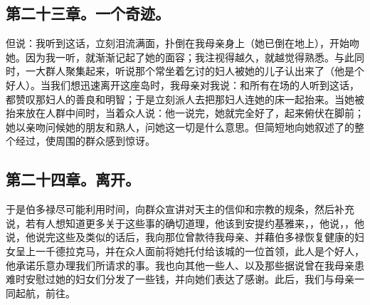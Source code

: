 
\subsection{第二十三章。一个奇迹。}

但说：我听到这话，立刻泪流满面，扑倒在我母亲身上（她已倒在地上），开始吻她。因为我一听，就渐渐记起了她的面容；我注视得越久，就越觉得熟悉。与此同时，一大群人聚集起来，听说那个常坐着乞讨的妇人被她的儿子认出来了（他是个好人）。当我们想迅速离开这座岛时，我母亲对我说：和所有在场的人听到这话，都赞叹那妇人的善良和明智；于是立刻派人去把那妇人连她的床一起抬来。当她被抬来放在人群中间时，当着众人说：他一说完，她就完全好了，起来俯伏在脚前；她以亲吻问候她的朋友和熟人，问她这一切是什么意思。但简短地向她叙述了的整个经过，使周围的群众感到惊讶。\par


\subsection{第二十四章。离开。}

于是伯多禄尽可能利用时间，向群众宣讲对天主的信仰和宗教的规条，然后补充说，若有人想知道更多关于这些事的确切道理，他该到安提约基雅来，，他说，，他说，他说完这些及类似的话后，我向那位曾款待我母亲、并藉伯多禄恢复健康的妇女呈上一千德拉克马，并在众人面前将她托付给该城的一位首领，此人是个好人，他承诺乐意办理我们所请求的事。我也向其他一些人、以及那些据说曾在我母亲患难时安慰过她的妇女们分发了一些钱，并向她们表达了感谢。此后，我们与母亲一同起航，前往。\par


